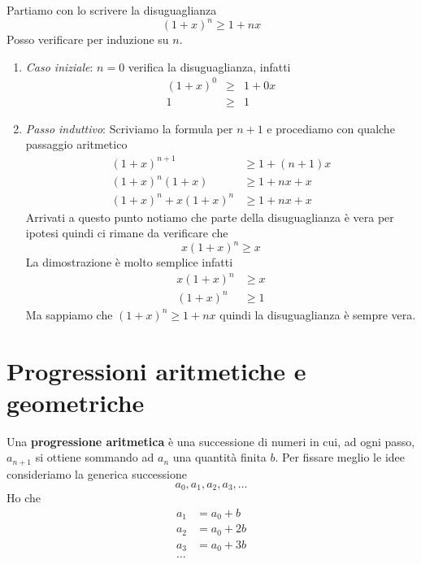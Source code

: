 \begin{example}
	Partiamo con lo scrivere la disuguaglianza
	\[
		(1 + x)^n \geq 1 + nx
	\]
	Posso verificare per induzione su $n$.
	\begin{enumerate}
		\item \emph{Caso iniziale}: $n = 0$ verifica la disuguaglianza, infatti
		      \[
			      \begin{array}{rcl}
				      (1 + x)^0 & \geq & 1 + 0x \\
				      1         & \geq & 1
			      \end{array}
		      \]
		\item \emph{Passo induttivo}: Scriviamo la formula per $n + 1$ e procediamo con qualche
		      passaggio aritmetico
		      \[
			      \begin{array}{ll}
				      (1 + x)^{n + 1}        & \geq 1 + (n + 1)x \\
				      (1 + x)^n (1 + x)      & \geq 1 + nx + x   \\
				      (1 + x)^n + x(1 + x)^n & \geq 1 + nx + x
			      \end{array}
		      \]
		      Arrivati a questo punto notiamo che parte della disuguaglianza \`e vera per ipotesi
		      quindi ci rimane da verificare che
		      \[
			      x(1 + x)^n \geq x
		      \]
		      La dimostrazione \`e molto semplice infatti
		      \[
			      \begin{array}{ll}
				      x(1 + x)^n & \geq x \\
				      (1 + x)^n  & \geq 1
			      \end{array}
		      \]
		      Ma sappiamo che $(1 + x)^n \geq 1 + nx$ quindi la disuguaglianza \`e sempre vera.
	\end{enumerate}
\end{example}

\section{Progressioni aritmetiche e geometriche}
\begin{definition}
	Una \textbf{progressione aritmetica} \`e una successione di numeri in cui, ad ogni passo,
	$a_{n + 1}$ si ottiene sommando ad $a_n$ una quantit\`a finita $b$.
	Per fissare meglio le idee consideriamo la generica successione
	\[
		a_0, a_1, a_2, a_3, \dots
	\]
	Ho che
	\[
		\begin{array}{ll}
			a_1 & = a_0 + b  \\
			a_2 & = a_0 + 2b \\
			a_3 & = a_0 + 3b \\
			\dots
		\end{array}
	\]
\end{definition}

